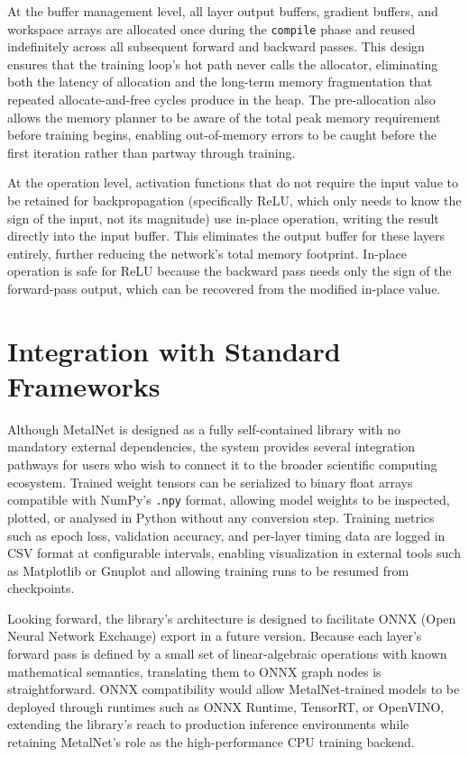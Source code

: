 \documentclass[12pt,oneside,a4paper]{report}
\begin{document}
At the buffer management level, all layer output buffers, gradient buffers, and workspace arrays are allocated once during the \texttt{compile} phase and reused indefinitely across all subsequent forward and backward passes. This design ensures that the training loop's hot path never calls the allocator, eliminating both the latency of allocation and the long-term memory fragmentation that repeated allocate-and-free cycles produce in the heap. The pre-allocation also allows the memory planner to be aware of the total peak memory requirement before training begins, enabling out-of-memory errors to be caught before the first iteration rather than partway through training.

At the operation level, activation functions that do not require the input value to be retained for backpropagation (specifically ReLU, which only needs to know the sign of the input, not its magnitude) use in-place operation, writing the result directly into the input buffer. This eliminates the output buffer for these layers entirely, further reducing the network's total memory footprint. In-place operation is safe for ReLU because the backward pass needs only the sign of the forward-pass output, which can be recovered from the modified in-place value.

\section{Integration with Standard Frameworks}

Although MetalNet is designed as a fully self-contained library with no mandatory external dependencies, the system provides several integration pathways for users who wish to connect it to the broader scientific computing ecosystem. Trained weight tensors can be serialized to binary float arrays compatible with NumPy's \texttt{.npy} format, allowing model weights to be inspected, plotted, or analysed in Python without any conversion step. Training metrics such as epoch loss, validation accuracy, and per-layer timing data are logged in CSV format at configurable intervals, enabling visualization in external tools such as Matplotlib or Gnuplot and allowing training runs to be resumed from checkpoints.

\newpage

Looking forward, the library's architecture is designed to facilitate ONNX (Open Neural Network Exchange) export in a future version. Because each layer's forward pass is defined by a small set of linear-algebraic operations with known mathematical semantics, translating them to ONNX graph nodes is straightforward. ONNX compatibility would allow MetalNet-trained models to be deployed through runtimes such as ONNX Runtime, TensorRT, or OpenVINO, extending the library's reach to production inference environments while retaining MetalNet's role as the high-performance CPU training backend.
\end{document}
